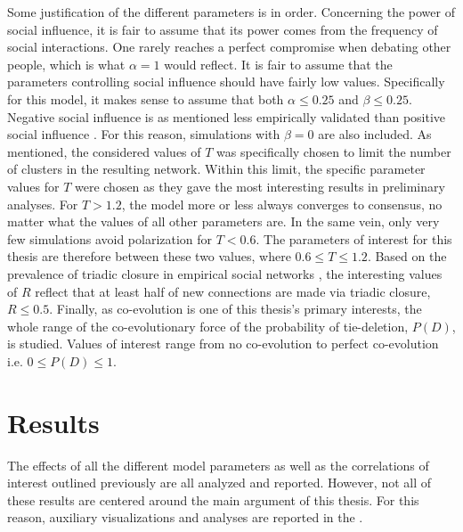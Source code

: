 \documentclass[11pt]{article}
\begin{document}
\noindent Some justification of the different parameters is in order. 
Concerning the power of social influence, it is fair to assume that its power comes from the frequency of social interactions. 
One rarely reaches a perfect compromise when debating other people, which is what $\alpha = 1$ would reflect. It is fair to assume that the parameters controlling social influence should have fairly low values. Specifically for this model, it makes sense to assume that both $\alpha \leq 0.25$ and $\beta \leq 0.25$. Negative social influence is as mentioned less empirically validated than positive social influence \cite{takacs_is_2014, turner_paths_2018}. For this reason, simulations with $\beta = 0$ are also included. 
As mentioned, the considered values of $T$ was specifically chosen to limit the number of clusters in the resulting network. Within this limit, the specific parameter values for $T$ were chosen as they gave the most interesting results in preliminary analyses. For $T > 1.2$, the model more or less always converges to consensus, no matter what the values of all other parameters are. In the same vein, only very few simulations avoid polarization for $T < 0.6$. The parameters of interest for this thesis are therefore between these two values, where $0.6 \leq T \leq 1.2$. 
Based on the prevalence of triadic closure in empirical social networks \cite{kossinets_origins_2009}, the interesting values of $R$ reflect that at least half of new connections are made via triadic closure, $R \leq 0.5$.
Finally, as co-evolution is one of this thesis's primary interests, the whole range of the co-evolutionary force of the probability of tie-deletion, $P(D)$, is studied. Values of interest range from no co-evolution to perfect co-evolution i.e. $0 \leq P(D) \leq 1$.

\section{Results}
The effects of all the different model parameters as well as the correlations of interest outlined previously are all analyzed and reported. However, not all of these results are centered around the main argument of this thesis. For this reason, auxiliary visualizations and analyses are reported in the \textit{}.
\end{document}
